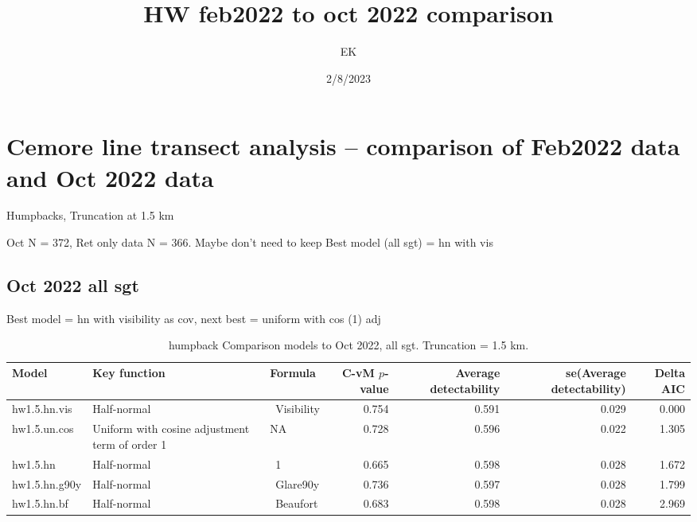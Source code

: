 \documentclass[
]{article}
\title{HW feb2022 to oct 2022 comparison}
\author{EK}
\date{2/8/2023}
\begin{document}
\maketitle

\hypertarget{cemore-line-transect-analysis-comparison-of-feb2022-data-and-oct-2022-data}{%
\section{Cemore line transect analysis -- comparison of Feb2022 data and
Oct 2022
data}\label{cemore-line-transect-analysis-comparison-of-feb2022-data-and-oct-2022-data}}

Humpbacks, Truncation at 1.5 km

Oct N = 372, Ret only data N = 366. Maybe don't need to keep Best model
(all sgt) = hn with vis

\hypertarget{oct-2022-all-sgt}{%
\subsection{Oct 2022 all sgt}\label{oct-2022-all-sgt}}

Best model = hn with visibility as cov, next best = uniform with cos (1)
adj

\begin{landscape}\begin{table}

\caption{\label{tab:oct-all-sgt}humpback  Comparison models to Oct 2022, all sgt. Truncation = 1.5 km.}
\centering
\begin{tabular}[t]{l|l|l|r|r|r|r}
\hline
Model & Key function & Formula & C-vM $p$-value & Average detectability & se(Average detectability) & Delta AIC\\
\hline
hw1.5.hn.vis & Half-normal & ~Visibility & 0.754 & 0.591 & 0.029 & 0.000\\
\hline
hw1.5.un.cos & Uniform with cosine adjustment term of order 1 & NA & 0.728 & 0.596 & 0.022 & 1.305\\
\hline
hw1.5.hn & Half-normal & ~1 & 0.665 & 0.598 & 0.028 & 1.672\\
\hline
hw1.5.hn.g90y & Half-normal & ~Glare90y & 0.736 & 0.597 & 0.028 & 1.799\\
\hline
hw1.5.hn.bf & Half-normal & ~Beaufort & 0.683 & 0.598 & 0.028 & 2.969\\
\hline
\end{tabular}
\end{table}
\end{landscape}
\end{document}
